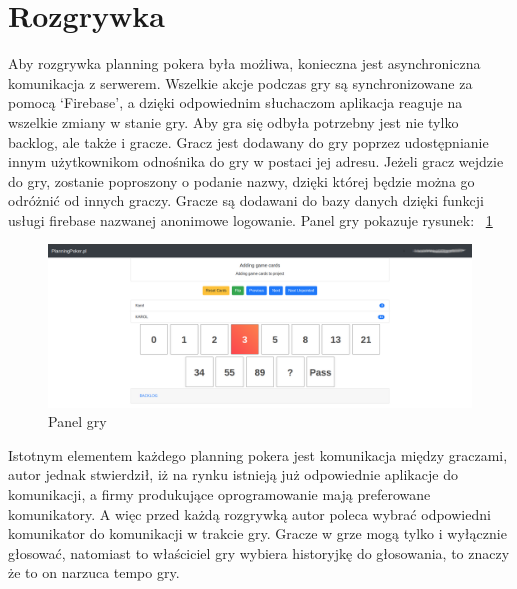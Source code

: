 \section{Rozgrywka}

Aby rozgrywka planning pokera była możliwa,
konieczna jest asynchroniczna komunikacja z serwerem.
Wszelkie akcje podczas gry są synchronizowane za pomocą `Firebase',
a dzięki odpowiednim słuchaczom aplikacja reaguje na wszelkie zmiany w stanie gry.
Aby gra się odbyła potrzebny jest nie tylko backlog, ale także i gracze.
Gracz jest dodawany do gry poprzez udostępnianie innym użytkownikom odnośnika do gry w postaci jej adresu.
Jeżeli gracz wejdzie do gry, zostanie poproszony o podanie nazwy,
dzięki której będzie można go odróżnić od innych graczy.
Gracze są dodawani do bazy danych dzięki funkcji usługi firebase nazwanej anonimowe logowanie.
Panel gry pokazuje rysunek:
~\ref{rys:gra}
\begin{figure}
	\centering\includegraphics[width=.7\textwidth]{img/gra}
	\caption{Panel gry}\label{rys:gra}%
\end{figure}
Istotnym elementem każdego planning pokera jest komunikacja między graczami,
autor jednak stwierdził,
iż na rynku istnieją już odpowiednie aplikacje do komunikacji,
a firmy produkujące oprogramowanie mają preferowane komunikatory.
A więc przed każdą rozgrywką autor poleca wybrać odpowiedni komunikator do komunikacji w trakcie gry.
Gracze w grze mogą tylko i wyłącznie głosować,
natomiast to właściciel gry wybiera historyjkę do głosowania, to znaczy że to on narzuca tempo gry.
